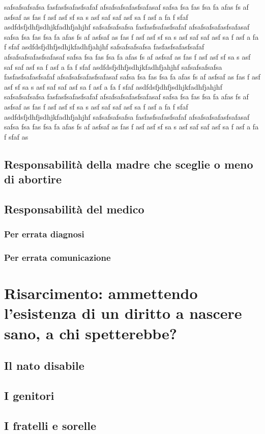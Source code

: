 safsafsafsafsa
fasfasfsafasfsafaf
afsafsafsafasfsafasaf safsa fsa fas fsa fa afas fs af asfsaf as fas f asf asf sf sa s asf saf saf asf sa f asf a fa f sfaf asdfdsfjdhfjsdhjkfadhfjahjhf
safsafsafsafsa
fasfasfsafasfsafaf
afsafsafsafasfsafasaf safsa fsa fas fsa fa afas fs af asfsaf as fas f asf asf sf sa s asf saf saf asf sa f asf a fa f sfaf asdfdsfjdhfjsdhjkfadhfjahjhf
safsafsafsafsa
fasfasfsafasfsafaf
afsafsafsafasfsafasaf safsa fsa fas fsa fa afas fs af asfsaf as fas f asf asf sf sa s asf saf saf asf sa f asf a fa f sfaf asdfdsfjdhfjsdhjkfadhfjahjhf
safsafsafsafsa
fasfasfsafasfsafaf
afsafsafsafasfsafasaf safsa fsa fas fsa fa afas fs af asfsaf as fas f asf asf sf sa s asf saf saf asf sa f asf a fa f sfaf asdfdsfjdhfjsdhjkfadhfjahjhf
safsafsafsafsa
fasfasfsafasfsafaf
afsafsafsafasfsafasaf safsa fsa fas fsa fa afas fs af asfsaf as fas f asf asf sf sa s asf saf saf asf sa f asf a fa f sfaf asdfdsfjdhfjsdhjkfadhfjahjhf
safsafsafsafsa
fasfasfsafasfsafaf
afsafsafsafasfsafasaf safsa fsa fas fsa fa afas fs af asfsaf as fas f asf asf sf sa s asf saf saf asf sa f asf a fa f sfaf as
\subsection{Responsabilità della madre che sceglie o meno di abortire}
\subsection{Responsabilità del medico}
\subsubsection{Per errata diagnosi}
\subsubsection{Per errata comunicazione}
\section{Risarcimento: ammettendo l'esistenza di un diritto a nascere sano, a chi spetterebbe?}
\subsection{Il nato disabile}
\subsection{I genitori}
\subsection{I fratelli e sorelle}